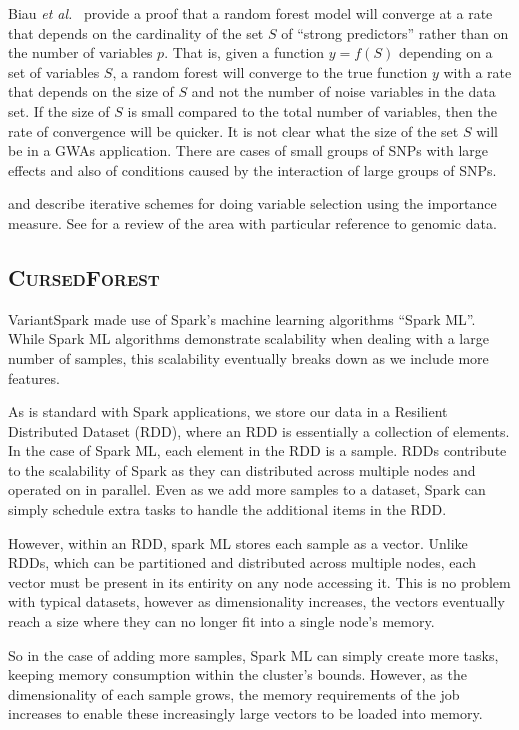 \documentclass[10pt,letterpaper]{article}
\newcommand{\cursedforest}{\textsc{CursedForest}\xspace}
\begin{document}
Biau {\it et al.}~\cite{Biau.2012} provide a proof that a random forest model will converge at a rate that depends on
the cardinality of the set $S$ of ``strong predictors'' rather than on the number of variables $p$. That is, given a
function $y=f(S)$ depending on a set of variables $S$, a random forest will converge to the true function $y$ with a
rate that depends on the size of $S$ and not the number of noise variables in the data set. If the size of $S$ is small
compared to the total number of variables, then the rate of convergence will be quicker. It is not clear what the size
of the set $S$ will be in a GWAs application. There are cases of small groups of SNPs with large effects and also of
conditions caused by the interaction of large groups of SNPs.

\cite{Genuer.et.al.2010} and \cite{Diaz.and.Alvarez.2006} describe iterative schemes for doing variable selection using
the importance measure. See \cite{Chen.and.Ishwaran.2012} for a review of the area with particular reference to genomic
data.

\subsection{\cursedforest}
VariantSpark made use of Spark's machine learning algorithms ``Spark ML''. While Spark ML algorithms demonstrate
scalability when dealing with a large number of samples, this scalability eventually breaks down as we include more
features.

As is standard with Spark applications, we store our data in a Resilient Distributed Dataset (RDD), where an RDD is
essentially a collection of elements. In the case of Spark ML, each element in the RDD is a sample. RDDs contribute to
the scalability of Spark as they can distributed across multiple nodes and operated on in parallel. Even as we add more
samples to a dataset, Spark can simply schedule extra tasks to handle the additional items in the RDD.

However, within an RDD, spark ML stores each sample as a vector. Unlike RDDs, which can be partitioned and distributed
across multiple nodes, each vector must be present in its entirity on any node accessing it. This is no problem with
typical datasets, however as dimensionality increases, the vectors eventually reach a size where they can no longer fit
into a single node's memory.

So in the case of adding more samples, Spark ML can simply create more tasks, keeping memory consumption within the
cluster's bounds. However, as the dimensionality of each sample grows, the memory requirements of the job increases to
enable these increasingly large vectors to be loaded into memory.  
\end{document}
